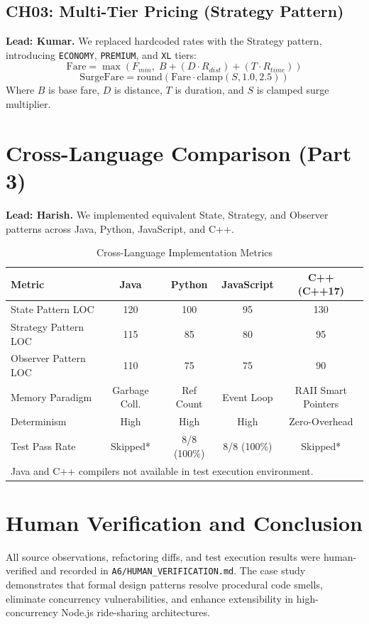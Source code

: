 \documentclass[conference]{IEEEtran}
\begin{document}
\subsection{CH03: Multi-Tier Pricing (Strategy Pattern)}
\textbf{Lead: Kumar.} We replaced hardcoded rates with the Strategy pattern, introducing \texttt{ECONOMY}, \texttt{PREMIUM}, and \texttt{XL} tiers:
\begin{equation}
\text{Fare} = \max\left(F_{min}, \; B + (D \cdot R_{dist}) + (T \cdot R_{time})\right)
\end{equation}
\begin{equation}
\text{SurgeFare} = \text{round}\left(\text{Fare} \cdot \text{clamp}(S, 1.0, 2.5)\right)
\end{equation}
Where $B$ is base fare, $D$ is distance, $T$ is duration, and $S$ is clamped surge multiplier.

\section{Cross-Language Comparison (Part 3)}
\textbf{Lead: Harish.} We implemented equivalent State, Strategy, and Observer patterns across Java, Python, JavaScript, and C++.

\begin{table}[htbp]
\caption{Cross-Language Implementation Metrics}
\begin{center}
\begin{tabular}{lcccc}
\toprule
\textbf{Metric} & \textbf{Java} & \textbf{Python} & \textbf{JavaScript} & \textbf{C++ (C++17)} \\
\midrule
State Pattern LOC & 120 & 100 & 95 & 130 \\
Strategy Pattern LOC & 115 & 85 & 80 & 95 \\
Observer Pattern LOC & 110 & 75 & 75 & 90 \\
Memory Paradigm & Garbage Coll. & Ref Count & Event Loop & RAII Smart Pointers \\
Determinism & High & High & High & Zero-Overhead \\
Test Pass Rate & Skipped* & 8/8 (100\%) & 8/8 (100\%) & Skipped* \\
\bottomrule
\multicolumn{5}{l}{\footnotesize *Java and C++ compilers not available in test execution environment.}
\end{tabular}
\end{center}
\end{table}

\section{Human Verification and Conclusion}
All source observations, refactoring diffs, and test execution results were human-verified and recorded in \texttt{A6/HUMAN\_VERIFICATION.md}. The case study demonstrates that formal design patterns resolve procedural code smells, eliminate concurrency vulnerabilities, and enhance extensibility in high-concurrency Node.js ride-sharing architectures.
\end{document}
